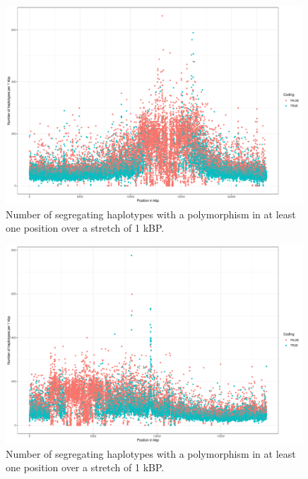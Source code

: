 \begin{figure}[th]
\centering
\includegraphics[height=.55\textheight, width=0.99\textwidth]{Figures/chr3_hap}
\decoRule
\caption[Haplotype strutcture of chromosome 3 of \textit{A. thaliana}]{Number of segregating haplotypes with a polymorphism in at least one position over a stretch of 1 kBP. }
\label{fig:chr3}
\end{figure}


\begin{figure}[th]
\centering
\includegraphics[height=.55\textheight, width=0.99\textwidth]{Figures/chr4_hap}
\decoRule
\caption[Haplotype strutcture of chromosome 4 of \textit{A. thaliana}]{Number of segregating haplotypes with a polymorphism in at least one position over a stretch of 1 kBP. }
\label{fig:chr4}
\end{figure}


